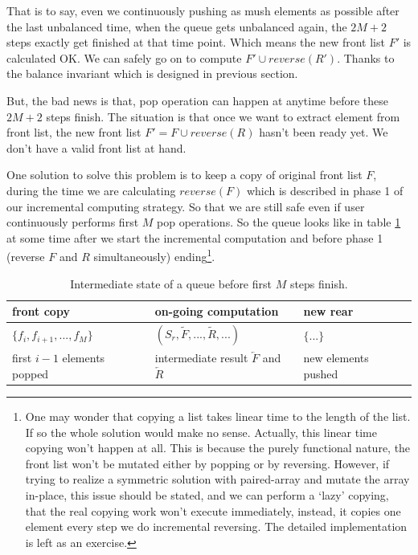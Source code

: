 \documentclass{article}
\begin{document}
That is to say, even we continuously pushing as mush elements as possible after
the last unbalanced time, when the queue gets unbalanced again, the $2M+2$ steps
exactly get finished at that time point. Which means the new front list $F'$ is
calculated OK. We can safely go on to compute $F' \cup reverse(R')$. Thanks to the
balance invariant which is designed in previous section.

But, the bad news is that, pop operation can happen at anytime before these
$2M+2$ steps finish. The situation is that once we want to extract element
from front list, the new front list $F' = F \cup reverse(R)$ hasn't been
ready yet. We don't have a valid front list at hand.

One solution to solve this problem is to keep a copy of original front list $F$,
during the time we are calculating $reverse(F)$ which is described in phase 1 of
our incremental computing strategy. So that we are still safe even if user
continuously performs first $M$ pop operations. So the queue looks like
in table \ref{tab:pop-before-m} at some time after we start the incremental computation and before
phase 1 (reverse $F$ and $R$ simultaneously) ending\footnote{One may wonder that copying
a list takes linear time to the length of the list. If so the whole solution
would make no sense. Actually, this linear time copying won't happen at all.
This is because the purely functional nature, the front list won't be mutated
either by popping or by reversing. However, if trying to realize a symmetric
solution with paired-array and mutate the array in-place, this issue should be stated, and
we can perform a `lazy' copying, that the real copying
work won't execute immediately, instead, it copies one element every step we
do incremental reversing. The detailed implementation is left as an exercise.}.

\begin{table}
\centering
\begin{tabular}{l l l}
  front copy & on-going computation & new rear \\
  \hline
  $\{ f_i, f_{i+1}, ..., f_M \}$ & $(S_r, \tilde{F}, ..., \tilde{R}, ...)$ & $ \{ ... \}$ \\
  first $i-1$ elements popped & intermediate result $\overleftarrow{F}$ and $\overleftarrow{R}$ & new elements pushed
\end{tabular}
\caption{Intermediate state of a queue before first $M$ steps finish.}
\label{tab:pop-before-m}
\end{table}
\end{document}
